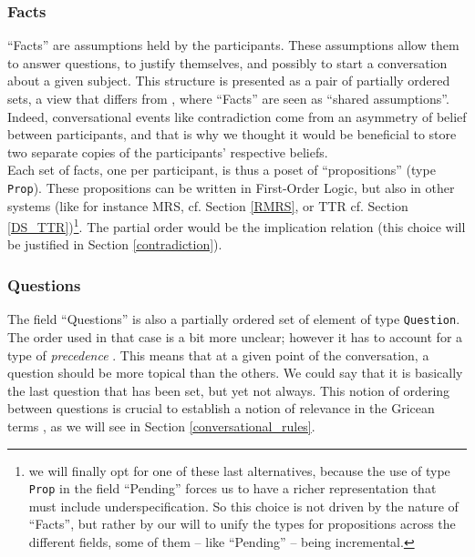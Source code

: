 \documentclass[11pt]{article}
\begin{document}
			\subsubsection{Facts}
				``Facts'' are assumptions held by the participants. These assumptions allow them to answer questions, to justify themselves, and possibly to start a conversation about a given subject. This structure is presented as a pair of partially ordered sets, a view that differs from \cite{ginzburg2012, ginzburg2017}, where ``Facts'' are seen as ``shared assumptions''. Indeed, conversational events like contradiction come from an asymmetry of belief between participants, and that is why we thought it would be beneficial to store two separate copies of the participants' respective beliefs.\\
				
				Each set of facts, one per participant, is thus a poset of ``propositions'' (type \texttt{Prop}). These propositions can be written in First-Order Logic, but also in other systems (like for instance MRS, cf. Section \ref{RMRS}, or TTR cf. Section \ref{DS_TTR})\footnote{we will finally opt for one of these last alternatives, because the use of type \texttt{Prop} in the field ``Pending'' forces us to have a richer representation that must include underspecification. So this choice is not driven by the nature of ``Facts'', but rather by our will to unify the types for propositions across the different fields, some of them -- like ``Pending'' -- being incremental.}. The partial order would be the implication relation (this choice will be justified in Section \ref{contradiction}).
			\subsubsection{Questions}
				The field ``Questions'' is also a partially ordered set of element of type \texttt{Question}. The order used in that case is a bit more unclear; however it has to account for a type of \textit{precedence} \cite{ginzburg2012}. This means that at a given point of the conversation, a question should be more topical than the others. We could say that it is basically the last question that has been set, but yet not always. This notion of ordering between questions is crucial to establish a notion of relevance in the Gricean terms \cite{grice1989}, as we will see in Section \ref{conversational_rules}.
\end{document}
